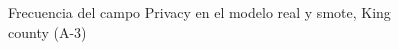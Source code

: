 \begin{figure}[H]
    \centering
    
    \caption{Frecuencia del campo Privacy en el modelo real y smote, King county (A-3)}
    \label{frecuency-smote-privacy}
\end{figure}